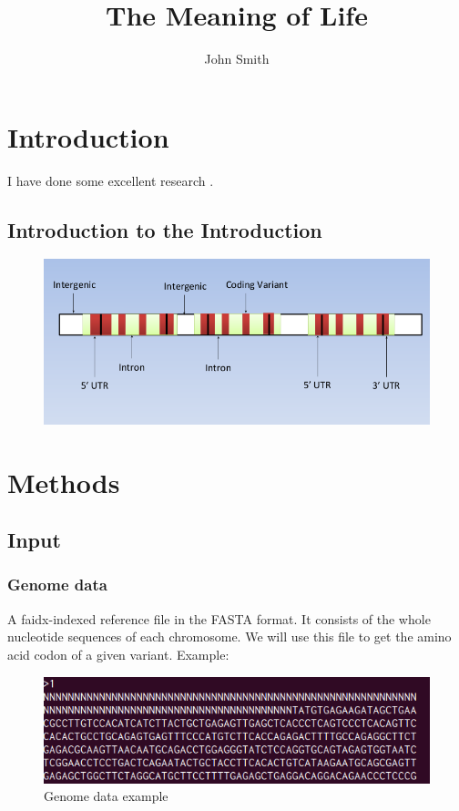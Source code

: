 \documentclass[onehalf,11pt]{beavtex}
\title{The Meaning of Life}
\author{John Smith}
\begin{document}
\maketitle

\mainmatter

\chapter{Introduction}
I have done some excellent research \cite{matrix}.
\section{Introduction to the Introduction}
\begin{figure}[!ht]
\centering
\includegraphics[scale=0.6]{./pic/type.png}
\caption{}
\end{figure}


\chapter{Methods}

\section{Input}

\subsection{Genome data}
A faidx-indexed reference file in the FASTA format. It consists of the whole nucleotide sequences of each chromosome. We will use this file to get the amino acid codon of a given variant.
Example:

\begin{figure}[!ht]
\centering
\includegraphics[scale=0.8]{./pic/genome.png}
\caption{Genome data example}
\end{figure}
\end{document}

